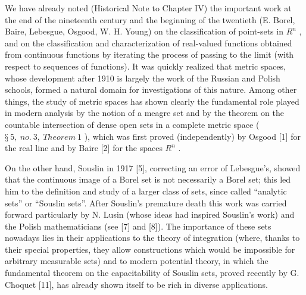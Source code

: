 We have already noted (Historical Note to Chapter IV) the important work at the end of the nineteenth century and the beginning of the twentieth (E. Borel, Baire, Lebesgue, Osgood, W. H. Young) on the classification of point-sets in \(R^{n}\) , and on the classification and characterization of real-valued functions obtained from continuous functions by iterating the process of passing to the limit (with respect to sequences of functions). It was quickly realized that metric spaces, whose development after 1910 is largely the work of the Russian and Polish schools, formed a natural domain for investigations of this nature. Among other things, the study of metric spaces has shown clearly the fundamental role played in modern analysis by the notion of a meagre set and by the theorem on the countable intersection of dense open sets in a complete metric space ( \(§\ 5,\ no.\ 3,\ Theorem\ 1\) ), which was first proved (independently) by Osgood {[}1{]} for the real line and by Baire {[}2{]} for the spaces \(R^{n}\) .

On the other hand, Souslin in 1917 {[}5{]}, correcting an error of Lebesgue's, showed that the continuous image of a Borel set is not necessarily a Borel set; this led him to the definition and study of a larger class of sets, since called ``analytic sets'' or ``Souslin sets''. After Souslin's premature death this work was carried forward particularly by N. Lusin (whose ideas had inspired Souslin's work) and the Polish mathematicians (see {[}7{]} and {[}8{]}). The importance of these sets nowadays lies in their applications to the theory of integration (where, thanks to their special properties, they allow constructions which would be impossible for arbitrary measurable sets) and to modern potential theory, in which the fundamental theorem on the capacitability of Souslin sets, proved recently by G. Choquet {[}11{]}, has already shown itself to be rich in diverse applications.

